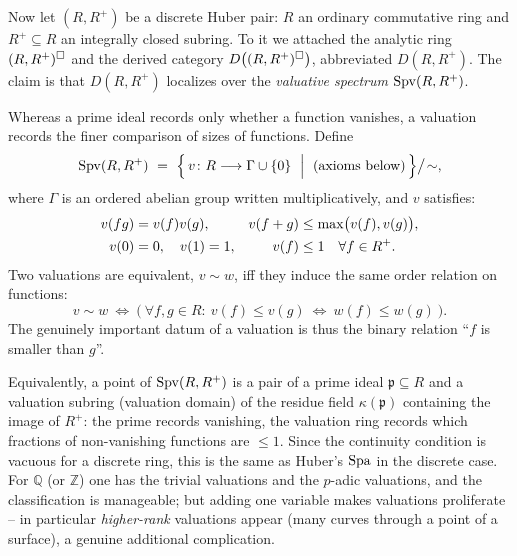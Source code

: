 Now let $(R,R^{+})$ be a discrete Huber pair: $R$ an ordinary commutative ring
and $R^{+}\subseteq R$ an integrally closed subring. To it we attached the
analytic ring $(R,R^{+})^{\square}$ and the derived category $D\bigl((R,R^{+})^{
\square}\bigr)$, abbreviated $D(R,R^{+})$. The claim is that $D(R,R^{+})$
localizes over the \emph{valuative spectrum} $\operatorname{Spv}(R,R^{+})$.

\begin{definition}
\label{def:9:valuative-spectrum}
Whereas a prime ideal records only whether a function vanishes, a valuation
records the finer comparison of sizes of functions. Define
\begin{equation*}
\operatorname{Spv}(R,R^{+})\ =\ \Bigl\{\, v\colon R\longrightarrow\Gamma\cup\{0\}\ \Bigm|\
(\text{axioms below})\,\Bigr\}\big/\!\sim,
\end{equation*}
where $\Gamma$ is an ordered abelian group written multiplicatively, and $v$
satisfies:
\begin{align}
\label{eq:9:valuation-axioms}
v(fg)&=v(f)v(g), & v(f+g)&\le\max\bigl(v(f),v(g)\bigr), \notag\\
v(0)&=0,\quad v(1)=1, & v(f)&\le 1\quad\forall f\in R^{+}.
\end{align}
Two valuations are equivalent, $v\sim w$, iff they induce the same order
relation on functions:
\begin{equation*}
v\sim w\ \iff\ \bigl(\ \forall f,g\in R:\ v(f)\le v(g)\ \Longleftrightarrow\
w(f)\le w(g)\ \bigr).
\end{equation*}
The genuinely important datum of a valuation is thus the binary relation
``$f$ is smaller than $g$''.
\end{definition}

\begin{remark}
\label{rmk:9:spv-second}
\ts{00:37:51}
Equivalently, a point of $\operatorname{Spv}(R,R^{+})$ is a pair of a prime ideal
$\mathfrak p\subseteq R$ and a valuation subring (valuation domain) of the
residue field $\kappa(\mathfrak p)$ containing the image of $R^{+}$: the prime
records vanishing, the valuation ring records which fractions of non-vanishing
functions are $\le 1$. Since the continuity condition is vacuous for a discrete
ring, this is the same as Huber's $\operatorname{Spa}$ in the discrete case. For $\mathbb Q$
(or $\mathbb Z$) one has the trivial valuations and the $p$-adic valuations, and
the classification is manageable; but adding one variable makes valuations
proliferate -- in particular \emph{higher-rank} valuations appear (many curves
through a point of a surface), a genuine additional complication.
\end{remark}

